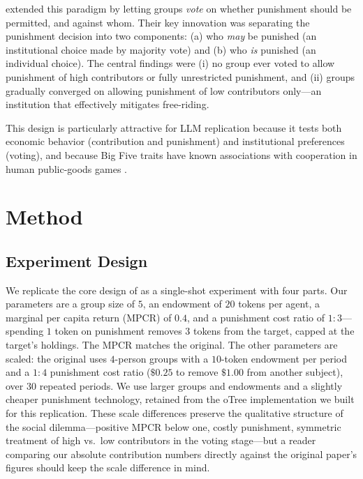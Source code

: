 \documentclass[12pt, a4paper]{article}
\begin{document}
\citet{ertan2009who} extended this paradigm by letting groups \emph{vote} on whether punishment should be permitted, and against whom. Their key innovation was separating the punishment decision into two components: (a) who \emph{may} be punished (an institutional choice made by majority vote) and (b) who \emph{is} punished (an individual choice). The central findings were (i) no group ever voted to allow punishment of high contributors or fully unrestricted punishment, and (ii) groups gradually converged on allowing punishment of low contributors only---an institution that effectively mitigates free-riding.

This design is particularly attractive for LLM replication because it tests both economic behavior (contribution and punishment) and institutional preferences (voting), and because Big Five traits have known associations with cooperation in human public-goods games \citep{volk2012personality}.

\section{Method}

\subsection{Experiment Design}

We replicate the core design of \citet{ertan2009who} as a single-shot experiment with four parts. Our parameters are a group size of $5$, an endowment of $20$ tokens per agent, a marginal per capita return (MPCR) of $0.4$, and a punishment cost ratio of $1{:}3$---spending $1$ token on punishment removes $3$ tokens from the target, capped at the target's holdings. The MPCR matches the original. The other parameters are scaled: the original \citet{ertan2009who} uses $4$-person groups with a $10$-token endowment per period and a $1{:}4$ punishment cost ratio ($\$0.25$ to remove $\$1.00$ from another subject), over $30$ repeated periods. We use larger groups and endowments and a slightly cheaper punishment technology, retained from the oTree implementation we built for this replication. These scale differences preserve the qualitative structure of the social dilemma---positive MPCR below one, costly punishment, symmetric treatment of high vs.\ low contributors in the voting stage---but a reader comparing our absolute contribution numbers directly against the original paper's figures should keep the scale difference in mind.
\end{document}
